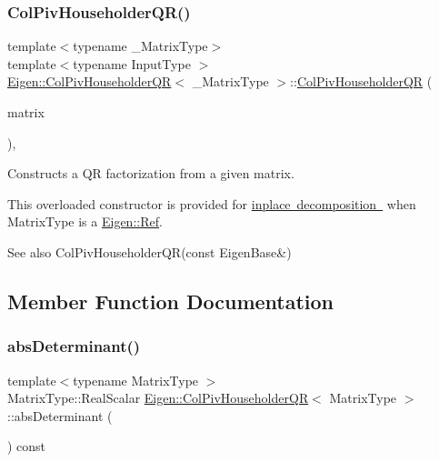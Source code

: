 \subsubsection{\texorpdfstring{ColPivHouseholderQR()}{ColPivHouseholderQR()}\hspace{0.1cm}{\footnotesize\ttfamily [4/4]}}
{\footnotesize\ttfamily template$<$typename \+\_\+\+Matrix\+Type$>$ \\
template$<$typename Input\+Type $>$ \\
\mbox{\hyperlink{class_eigen_1_1_col_piv_householder_q_r}{Eigen\+::\+Col\+Piv\+Householder\+QR}}$<$ \+\_\+\+Matrix\+Type $>$\+::\mbox{\hyperlink{class_eigen_1_1_col_piv_householder_q_r}{Col\+Piv\+Householder\+QR}} (\begin{DoxyParamCaption}\item[{\mbox{\hyperlink{struct_eigen_1_1_eigen_base}{Eigen\+Base}}$<$ Input\+Type $>$ \&}]{matrix }\end{DoxyParamCaption})\hspace{0.3cm}{\ttfamily [inline]}, {\ttfamily [explicit]}}



Constructs a QR factorization from a given matrix. 

This overloaded constructor is provided for \mbox{\hyperlink{}{inplace decomposition }} when {\ttfamily Matrix\+Type} is a \mbox{\hyperlink{class_eigen_1_1_ref}{Eigen\+::\+Ref}}.

\begin{DoxySeeAlso}{See also}
Col\+Piv\+Householder\+Q\+R(const Eigen\+Base\&) 
\end{DoxySeeAlso}


\subsection{Member Function Documentation}
\mbox{\label{class_eigen_1_1_col_piv_householder_q_r_ac87c3bf42098d6f7324dafbc50fa83f7}} 
\subsubsection{\texorpdfstring{absDeterminant()}{absDeterminant()}}
{\footnotesize\ttfamily template$<$typename Matrix\+Type $>$ \\
Matrix\+Type\+::\+Real\+Scalar \mbox{\hyperlink{class_eigen_1_1_col_piv_householder_q_r}{Eigen\+::\+Col\+Piv\+Householder\+QR}}$<$ Matrix\+Type $>$\+::abs\+Determinant (\begin{DoxyParamCaption}{ }\end{DoxyParamCaption}) const}

